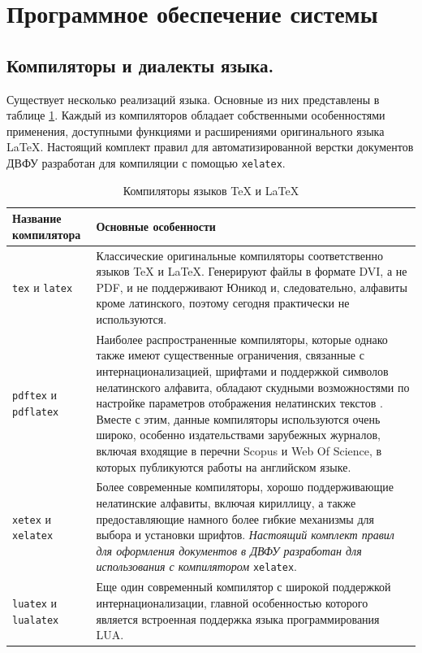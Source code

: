 \documentclass[report, draught]{fefudoc}
\begin{document}
\section{Программное обеспечение системы}
\subsection{Компиляторы и диалекты языка.}
Существует несколько реализаций языка.
Основные из них представлены в таблице \ref{таблица компиляторов}.
Каждый из компиляторов обладает собственными особенностями применения, доступными функциями и расширениями оригинального языка \LaTeX{}.
Настоящий комплект правил для автоматизированной верстки документов ДВФУ разработан для компиляции с помощью \texttt{xelatex}.

\begin{table}[ht]
\centering
\caption{Компиляторы языков \TeX{} и \LaTeX{}}
\label{таблица компиляторов}
\begin{tabularx}{\textwidth}{|l|X|}
\hline
\textbf{Название компилятора} & \textbf{Основные особенности} \\ \hline
\texttt{tex} и \texttt{latex} & Классические оригинальные компиляторы соответственно языков \TeX{} и \LaTeX{}. Генерируют файлы в формате DVI, а не PDF, и не поддерживают Юникод и, следовательно, алфавиты кроме латинского, поэтому сегодня практически не используются. \\ \hline
\texttt{pdftex} и \texttt{pdflatex} & Наиболее распространенные компиляторы, которые однако также имеют существенные ограничения, связанные с интернационализацией, шрифтами и поддержкой символов нелатинского алфавита, обладают скудными возможностями по настройке параметров отображения нелатинских текстов \cite{ПособиеLatex}. Вместе с этим, данные компиляторы используются очень широко, особенно издательствами зарубежных журналов, включая входящие в перечни Scopus и Web Of Science, в которых публикуются работы на английском языке. \\ \hline
\texttt{xetex} и \texttt{xelatex} & Более современные компиляторы, хорошо поддерживающие нелатинские алфавиты, включая кириллицу, а также предоставляющие намного более гибкие механизмы для выбора и установки шрифтов. \textit{Настоящий комплект правил для оформления документов в ДВФУ разработан для использования с компилятором} \texttt{xelatex}. \\ \hline
\texttt{luatex} и \texttt{lualatex} & Еще один современный компилятор с широкой поддержкой интернационализации, главной особенностью которого является встроенная поддержка языка программирования LUA. \\ \hline
\end{tabularx}
\end{table}
\end{document}
